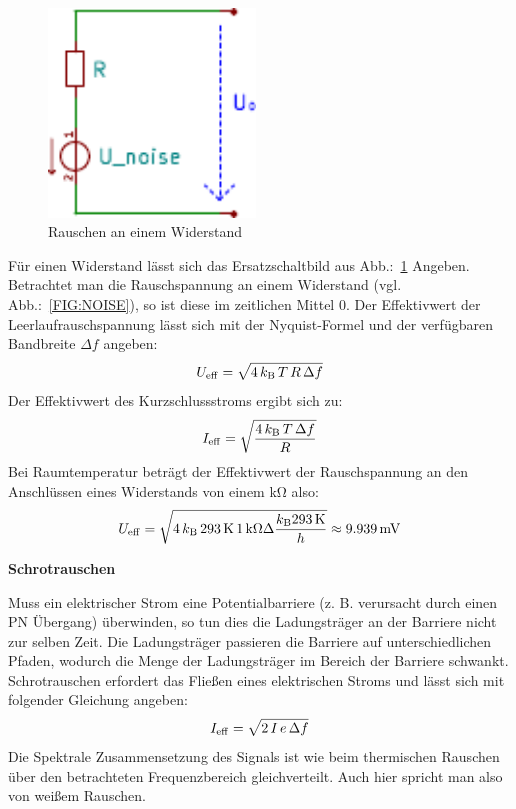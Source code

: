 \begin{figure}
  \centering
  \includegraphics[clip, width=0.49\textwidth]
  {./../common/schaltungen/widerstandsrauschen/widerstandsrauschen.pdf}
  \caption{Rauschen an einem Widerstand}\label{FIG:NOISEESB}
\end{figure}
Für einen Widerstand lässt sich das Ersatzschaltbild aus 
Abb.:~\ref{FIG:NOISEESB} Angeben.
Betrachtet man die Rauschspannung an einem Widerstand 
(vgl. Abb.:~\ref{FIG:NOISE}), so ist diese im zeitlichen Mittel 0.
Der Effektivwert der Leerlaufrauschspannung lässt sich mit der Nyquist-Formel 
und der verfügbaren Bandbreite $\Delta f$ angeben\cite[Nyquist]{Art:NYQUIST}:
\[U_{\rm eff} = \sqrt{4\, k_{\rm B}\, T\, R\, \Delta f}\]
Der Effektivwert des Kurzschlussstroms ergibt sich zu:
\[I_{\rm eff} = \sqrt{\frac{4\,k_{\rm B}\, T\, \Delta f}{R}}\]
Bei Raumtemperatur beträgt der Effektivwert der Rauschspannung an den 
Anschlüssen eines Widerstands von einem \si{\kilo\ohm} also:
\[U_{\rm eff} = 
\sqrt{4\, k_{\rm B}\, 293\,\si{\kelvin}\, 1\,\si{\kilo\ohm} \Delta 
\frac{k_{\rm B} 293\,\si{\kelvin}}{h}} \approx 9.939\,\si{\milli\volt}\]

\textbf{Schrotrauschen}

Muss ein elektrischer Strom eine Potentialbarriere (z. B. verursacht 
durch einen PN Übergang) überwinden, so tun dies die Ladungsträger an der 
Barriere nicht zur selben Zeit. Die Ladungsträger passieren die Barriere
auf unterschiedlichen Pfaden, wodurch die Menge der Ladungsträger im Bereich 
der Barriere schwankt.
Schrotrauschen erfordert das Fließen eines elektrischen Stroms und lässt sich 
mit folgender Gleichung angeben:
\[I_{\rm eff} = \sqrt{2\,I\,e\,\Delta f }\]
Die Spektrale Zusammensetzung des Signals ist wie beim thermischen Rauschen
über den betrachteten Frequenzbereich gleichverteilt.
Auch hier spricht man also von weißem Rauschen.  



